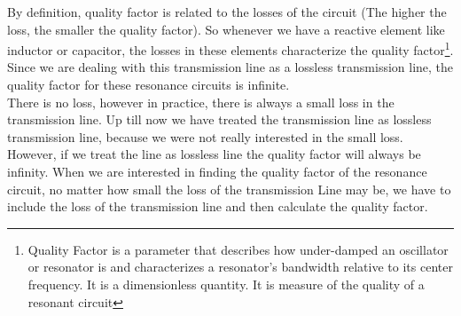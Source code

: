 By definition, quality factor is related to the losses of the circuit (The higher the loss, the smaller the quality factor). So whenever we have a reactive element like inductor or capacitor, the losses in these elements characterize the quality factor\footnote{Quality Factor is a parameter that describes how under-damped an oscillator or resonator is and characterizes a resonator's bandwidth relative to its center frequency. It is a dimensionless quantity.
	It is measure of the quality of a resonant circuit}. Since we are dealing with this transmission line as a lossless transmission line, the quality factor for these resonance circuits is infinite.\\
There is no loss, however in practice, there is always a small loss in the transmission line. Up till now we have treated the transmission line as lossless transmission line, because we were not really interested in the small loss. However, if we treat the line as lossless line the quality factor will always be infinity. When we are interested in finding the quality factor of the resonance circuit, no matter how small the loss of the transmission
Line may be, we have to include the loss of the transmission line and then calculate the quality factor.
